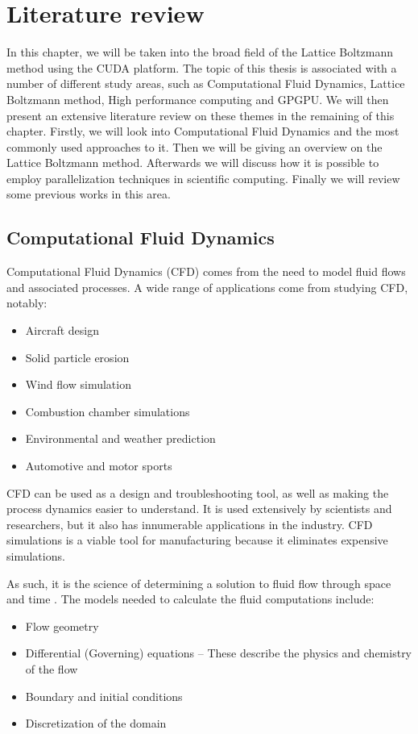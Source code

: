 \documentclass[12pt, openany]{book}
\begin{document}
\chapter{Literature review}
In this chapter, we will be taken into the broad field of the Lattice Boltzmann method using the CUDA platform. The topic of this thesis is associated with a number of different study areas, such as Computational Fluid Dynamics, Lattice Boltzmann method, High performance computing and GPGPU. We will then present an extensive literature review on these themes in the remaining of this chapter. Firstly, we will look into Computational Fluid Dynamics and the most commonly used approaches to it. Then we will be giving an overview on the Lattice Boltzmann method. Afterwards we will discuss how it is possible to employ parallelization techniques in scientific computing. Finally we will review some previous works in this area.
\section{Computational Fluid Dynamics}
Computational Fluid Dynamics (CFD) comes from the need to model fluid flows and associated processes.
A wide range of applications come from studying CFD, notably:
\begin{itemize}
\item Aircraft design \cite{aircraft_cfd}
\item Solid particle erosion \cite{partic_erosion_cfd}
\item Wind flow simulation \cite{wind_flow_cfd}
\item Combustion chamber simulations \cite{combust_cfd}
\item Environmental and weather prediction \cite{weather_pred}
\item Automotive and motor sports \cite{america_cup,race_car_wing}
\end{itemize}

CFD can be used as a design and troubleshooting tool, as well as making the process dynamics easier to understand. It is used extensively by scientists and researchers, but it also has innumerable applications in the industry. CFD simulations is a viable tool for manufacturing because it eliminates expensive simulations.\par
 As such, it is the science of determining a solution to fluid flow through space and time \cite{cfd_present}. The models needed to calculate the fluid computations include:
\begin{itemize}
\item	Flow geometry
\item	Differential (Governing) equations – These describe the physics and chemistry of the flow
\item Boundary and initial conditions
\item	Discretization of the domain
\end{itemize}
\end{document}
